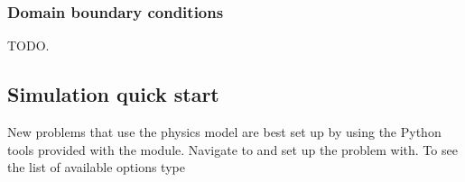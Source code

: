 \documentclass[letterpaper,10pt,english]{sphinxmanual}
\begin{document}
\begin{sphinxVerbatim}[commandchars=\\\{\},formatcom=\scriptsize]
  \PYG{p}{[}
      
       \PYG{p}{[}    \PYG{p}{]}
       
       
  \PYG{p}{]}
  \PYG{p}{[}
      
       \PYG{p}{[}    \PYG{p}{]}
       
       
  \PYG{p}{]}
\end{sphinxVerbatim}


\subsubsection{Domain boundary conditions}
\label{\detokenize{Applications/CdrPlasmaModel:domain-boundary-conditions}}
\sphinxAtStartPar
TODO.


\subsection{Simulation quick start}
\label{\detokenize{Applications/CdrPlasmaModel:simulation-quick-start}}\label{\detokenize{Applications/CdrPlasmaModel:chap-cdrplasmanewproblem}}
\sphinxAtStartPar
New problems that use the  physics model are best set up by using the Python tools provided with the module.
Navigate to  and set up the problem with.
To see the list of available options type
\end{document}
